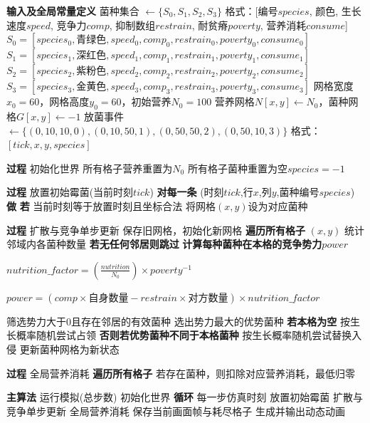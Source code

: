 \documentclass[12pt]{ctexart}
\begin{document}
\begin{center}
\label{alg:mold_sim}
\small
\begin{algorithmic}[1]

\State \textbf{输入及全局常量定义}
\State \quad 菌种集合 $\gets \{S_0,S_1,S_2,S_3\}$
\State \quad 格式：[编号$species$, 颜色, 生长速度$speed$, 竞争力$comp$, 抑制数组$restrain$, 耐贫瘠$poverty$, 营养消耗$consume$]
\State \quad $S_0=[species_0,\text{青绿色},speed_0,comp_0,restrain_0,poverty_0,consume_0]$
\State \quad $S_1=[species_1,\text{深红色},speed_1,comp_1,restrain_1,poverty_1,consume_1]$
\State \quad $S_2=[species_2,\text{紫粉色},speed_2,comp_2,restrain_2,poverty_2,consume_2]$
\State \quad $S_3=[species_3,\text{金黄色},speed_3,comp_3,restrain_3,poverty_3,consume_3]$
\State \quad 网格宽度$x_0=60$，网格高度$y_0=60$，初始营养$N_0=100$
\State \quad 营养网格$N[x,y]\gets N_0$，菌种网格$G[x,y]\gets -1$
\State \quad 放菌事件$\gets\{(0,10,10,0),(0,10,50,1),(0,50,50,2),(0,50,10,3)\}$
\State \quad 格式：$[tick,x,y,species]$

\State \textbf{过程} 初始化世界
\State \quad 所有格子营养重置为$N_0$
\State \quad 所有格子菌种重置为空$species=-1$

\State \textbf{过程} 放置初始霉菌(当前时刻$tick$)
\State \quad \textbf{对每一条} (时刻$tick$,行$x$,列$y$,菌种编号$species$) \textbf{做}
\State \quad \quad \textbf{若} 当前时刻等于放置时刻且坐标合法
\State \quad \quad \quad 将网格$(x,y)$设为对应菌种

\State \textbf{过程} 扩散与竞争单步更新
\State \quad 保存旧网格，初始化新网格
\State \quad \textbf{遍历所有格子} $(x,y)$
\State \quad \quad 统计邻域内各菌种数量
\State \quad \quad \textbf{若无任何邻居则跳过}
\State \quad \quad \textbf{计算每种菌种在本格的竞争势力$power$}

\State \quad \quad \quad $nutrition\_factor = (\frac{nutrition}{N_0}) \times  poverty^{-1}$

\State \quad \quad \quad $power = (comp\times \text{自身数量} - restrain\times \text{对方数量}) \times nutrition\_factor$

\State \quad \quad 筛选势力大于0且存在邻居的有效菌种
\State \quad \quad 选出势力最大的优势菌种
\State \quad \quad \textbf{若本格为空}
\State \quad \quad \quad 按生长概率随机尝试占领
\State \quad \quad \textbf{否则若优势菌种不同于本格菌种}
\State \quad \quad \quad 按生长概率随机尝试替换入侵
\State \quad 更新菌种网格为新状态

\State \textbf{过程} 全局营养消耗
\State \quad \textbf{遍历所有格子}
\State \quad \quad 若存在菌种，则扣除对应营养消耗，最低归零

\State \textbf{主算法} 运行模拟(总步数)
\State \quad 初始化世界
\State \quad \textbf{循环} 每一步仿真时刻
\State \quad \quad 放置初始霉菌
\State \quad \quad 扩散与竞争单步更新
\State \quad \quad 全局营养消耗
\State \quad \quad 保存当前画面帧与耗尽格子
\State \quad 生成并输出动态动画

\end{algorithmic}
\end{center}
\end{document}
